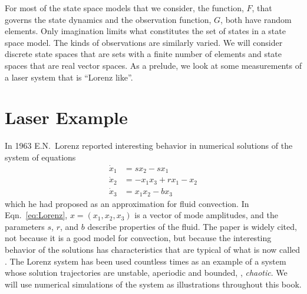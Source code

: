 For most of the state space models that we consider, the function,
$F$, that
governs the state dynamics and the observation function, $G$, both have
random elements.  Only imagination limits what constitutes the set of
states in a state space model.  The kinds of observations are
similarly varied.  We will consider discrete state spaces that are
sets with a finite number of elements and state spaces that are real
vector spaces.  As a prelude, we look at some measurements of a laser
system that is ``Lorenz like''.

\section{Laser Example}
\label{sec:laser}

In 1963 E.N.~Lorenz\cite{Lorenz63} %
%
reported interesting behavior in numerical solutions of the system of
equations
\begin{subequations}
  \label{eq:Lorenz}
  \begin{align}
    \dot x_1 &= s x_2 -s x_1\\
    \dot x_2 &= -x_1 x_3 + r x_1 - x_2 \\
    \dot x_3 &= x_1 x_2 - b x_3
  \end{align}
\end{subequations}
which he had proposed as an approximation for fluid convection.  In
Eqn.~\eqref{eq:Lorenz}, $x = (x_1,x_2,x_3)$ is a vector of mode
amplitudes, and the parameters $s$, $r$, and $b$ describe properties
of the fluid.  The paper is widely cited, not because it is a good
model for convection, but because the interesting behavior of the
solutions has characteristics that are typical of what is now called
\emph{}.  The Lorenz system has been used countless
times as an example of a system whose solution trajectories are
unstable, aperiodic and bounded, \ie, \emph{chaotic}.  We will use
numerical simulations of the system as illustrations throughout this
book.

